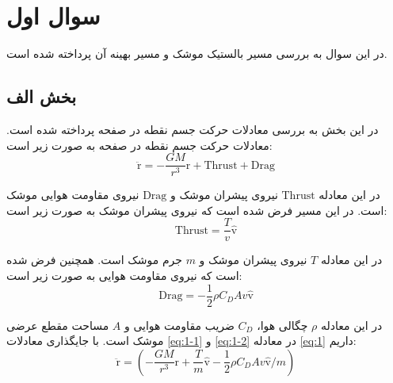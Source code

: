 \section{سوال اول}
در این سوال به بررسی مسیر بالستیک موشک و مسیر بهینه آن پرداخته شده است.
\subsection{بخش الف}
در این بخش به بررسی معادلات حرکت جسم نقطه در صفحه پرداخته شده است. معادلات حرکت جسم نقطه در صفحه به صورت زیر است:
\begin{equation}
    \label{eq:1}
    \ddot{\boldsymbol{\mathrm{r}}} = -\dfrac{GM}{r^3}\boldsymbol{\mathrm{r}} + \mathrm{Thrust} + \mathrm{Drag}
\end{equation}

در این معادله
$\mathrm{Thrust}$
نیروی پیشران موشک و
$\mathrm{Drag}$
نیروی مقاومت هوایی موشک است. در این مسیر فرض شده است که نیروی پیشران موشک به صورت زیر است:
\begin{equation}
    \label{eq:1-1}
    \mathrm{Thrust} = \dfrac{T}{v}\hat{\boldsymbol{\mathrm{v}}}
\end{equation}

در این معادله $T$ نیروی پیشران موشک و $m$ جرم موشک است. همچنین فرض شده است که نیروی مقاومت هوایی به صورت زیر است:
\begin{equation}
    \label{eq:1-2}
    \mathrm{Drag} = -\dfrac{1}{2}\rho C_D A v\hat{\boldsymbol{\mathrm{v}}}
\end{equation}

در این معادله $\rho$ چگالی هوا، $C_D$ ضریب مقاومت هوایی و $A$ مساحت مقطع عرضی موشک است. با جایگذاری معادلات \eqref{eq:1-1} و \eqref{eq:1-2} در معادله \eqref{eq:1} داریم:
\begin{equation}
    \label{eq:1-4}
    \ddot{\boldsymbol{\mathrm{r}}} = \left(-\dfrac{GM}{r^3}\boldsymbol{\mathrm{r}} + \dfrac{T}{m}\hat{\boldsymbol{\mathrm{v}}} - \dfrac{1}{2}\rho C_D A v\hat{\boldsymbol{\mathrm{v}}}/m\right)
\end{equation}

